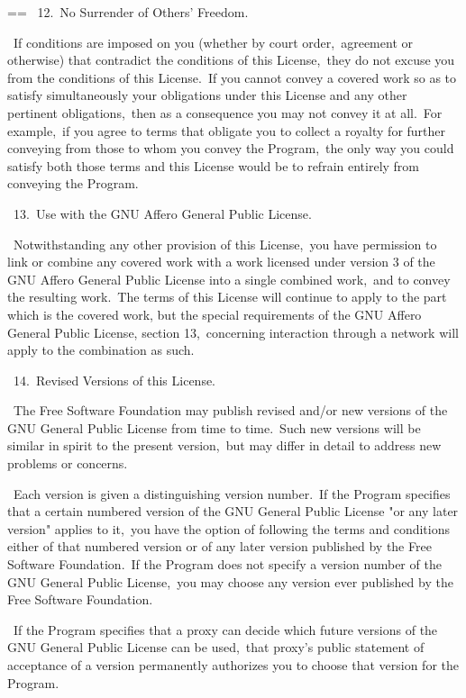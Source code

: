 \documentclass{book}
\makeatletter
\newenvironment{Texinfopreformatted}{%
  \par\GNUTobeylines\obeyspaces\frenchspacing\parskip=\z@\parindent=\z@}{}
{\catcode`\^^M=13 \gdef\GNUTobeylines{\catcode`\^^M=13 \def^^M{\null\par}}}
\newenvironment{Texinfoindented}{\begin{list}{}{}\item\relax}{\end{list}}
\renewcommand{\_}{\Texinfounderscore\discretionary{}{}{}}
\makeatother
\begin{document}
\begin{Texinfoindented}
\begin{Texinfopreformatted}
\  12.\ No Surrender of Others' Freedom.

\  If conditions are imposed on you (whether by court order,\ agreement or
otherwise) that contradict the conditions of this License,\ they do not
excuse you from the conditions of this License.\  If you cannot convey a
covered work so as to satisfy simultaneously your obligations under this
License and any other pertinent obligations,\ then as a consequence you may
not convey it at all.\  For example,\ if you agree to terms that obligate you
to collect a royalty for further conveying from those to whom you convey
the Program,\ the only way you could satisfy both those terms and this
License would be to refrain entirely from conveying the Program.

\  13.\ Use with the GNU Affero General Public License.

\  Notwithstanding any other provision of this License,\ you have
permission to link or combine any covered work with a work licensed
under version 3 of the GNU Affero General Public License into a single
combined work,\ and to convey the resulting work.\  The terms of this
License will continue to apply to the part which is the covered work,
but the special requirements of the GNU Affero General Public License,
section 13,\ concerning interaction through a network will apply to the
combination as such.

\  14.\ Revised Versions of this License.

\  The Free Software Foundation may publish revised and/or new versions of
the GNU General Public License from time to time.\  Such new versions will
be similar in spirit to the present version,\ but may differ in detail to
address new problems or concerns.

\  Each version is given a distinguishing version number.\  If the
Program specifies that a certain numbered version of the GNU General
Public License "or any later version" applies to it,\ you have the
option of following the terms and conditions either of that numbered
version or of any later version published by the Free Software
Foundation.\  If the Program does not specify a version number of the
GNU General Public License,\ you may choose any version ever published
by the Free Software Foundation.

\  If the Program specifies that a proxy can decide which future
versions of the GNU General Public License can be used,\ that proxy's
public statement of acceptance of a version permanently authorizes you
to choose that version for the Program.


\end{Texinfopreformatted}
\end{Texinfoindented}
\end{document}
